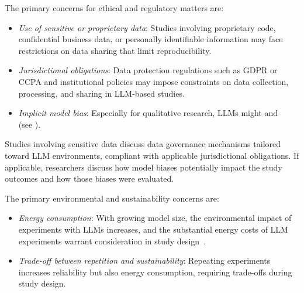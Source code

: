 The primary concerns for ethical and regulatory matters are:
\begin{itemize}
    \item \emph{Use of sensitive or proprietary data}: Studies involving proprietary code, confidential business data, or personally identifiable information may face restrictions on data sharing that limit reproducibility.
    \item \emph{Jurisdictional obligations}: Data protection regulations such as GDPR or CCPA and institutional policies may impose constraints on data collection, processing, and sharing in LLM-based studies.
    \item \emph{Implicit model bias}: Especially for qualitative research, LLMs might  and ~\cite{jowsey2025reject} (see \humanvalidation).
\end{itemize}

Studies involving sensitive data \must discuss data governance mechanisms tailored toward LLM environments, compliant with applicable jurisdictional obligations. If applicable, researchers \should discuss how model biases potentially impact the study outcomes and how those biases were evaluated.

The primary environmental and sustainability concerns are:
\begin{itemize}
    \item \emph{Energy consumption}: With growing model size, the environmental impact of experiments with LLMs increases, and the substantial energy costs of LLM experiments warrant consideration in study design~\cite{DBLP:conf/acl/StrubellGM19}.
    \item \emph{Trade-off between repetition and sustainability}: Repeating experiments increases reliability but also energy consumption, requiring trade-offs during study design.
\end{itemize}

